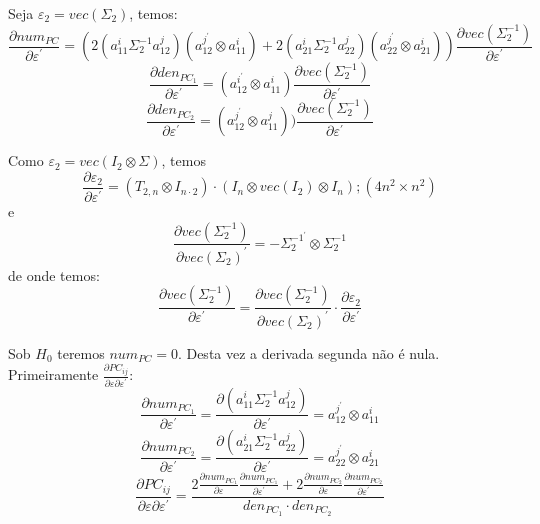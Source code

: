 \documentclass[a4paper,10pt]{article}
\begin{document}
Seja $\varepsilon_{2} = vec(\Sigma_{2})$, temos:
\begin{equation}
\frac{\partial num_{PC}}{\partial \varepsilon^{'}} = (2 (a_{11}^{i} \Sigma_{2}^{-1} a_{12}^{j}) (a_{12}^{j^{'}} \otimes a_{11}^{i}) +
2 (a_{21}^{i} \Sigma_{2}^{-1} a_{22}^{j}) (a_{22}^{j^{'}} \otimes a_{21}^{i}) )
\frac{\partial vec(\Sigma_{2}^{-1})}{\partial \varepsilon^{'}}
\end{equation}
\begin{equation}
\frac{\partial den_{PC_{1}}}{\partial \varepsilon^{'}} = (a_{12}^{i^{'}} \otimes a_{11}^{i}) 
\frac{\partial vec(\Sigma_{2}^{-1})}{\partial \varepsilon^{'}}
\end{equation}
\begin{equation}
\frac{\partial den_{PC_{2}}}{\partial \varepsilon^{'}} = (a_{12}^{j^{'}} \otimes a_{11}^{j}) )
\frac{\partial vec(\Sigma_{2}^{-1})}{\partial \varepsilon^{'}}
\end{equation}

Como $\varepsilon_{2} = vec(I_{2} \otimes \Sigma)$, temos
\begin{equation}
\frac{\partial \varepsilon_{2}}{\partial \varepsilon^{'}} = (T_{2,n} \otimes I_{n \cdot 2}) \cdot (I_{n} \otimes vec(I_{2}) \otimes I_{n}); (4n^{2} \times n^{2})
\end{equation}
e
\begin{equation}
\frac{\partial vec(\Sigma_{2}^{-1})}{\partial vec(\Sigma_{2})^{'}} = -\Sigma_{2}^{-1^{'}} \otimes \Sigma_{2}^{-1}
\end{equation}
de onde temos:
\begin{equation}
\frac{\partial vec(\Sigma_{2}^{-1})}{\partial \varepsilon^{'}} = \frac{\partial vec(\Sigma_{2}^{-1})}{\partial vec(\Sigma_{2})^{'}} \cdot \frac{\partial \varepsilon_{2}}{\partial \varepsilon^{'}}
\end{equation}

Sob $H_0$ teremos $num_{PC} = 0$. Desta vez a derivada segunda não é nula. Primeiramente $\frac{\partial PC_{ij}}{\partial \varepsilon \partial \varepsilon^{'}}$:
\begin{equation}
\frac{\partial num_{PC_{1}}}{\partial \varepsilon^{'}} = \frac{\partial (a_{11}^{i} \Sigma_{2}^{-1} a_{12}^{j})}{\partial \varepsilon^{'}} = a_{12}^{j^{'}} \otimes a_{11}^{i}
\end{equation}
\begin{equation}
\frac{\partial num_{PC_{2}}}{\partial \varepsilon^{'}} = \frac{\partial (a_{21}^{i} \Sigma_{2}^{-1} a_{22}^{j})}{\partial \varepsilon^{'}} = a_{22}^{j^{'}} \otimes a_{21}^{i}
\end{equation}
\begin{equation}
\frac{\partial PC_{ij}}{\partial \varepsilon \partial \varepsilon^{'}} = \frac{2 \frac{\partial num_{PC_{1}}}{\partial \varepsilon} \frac{\partial num_{PC_{1}}}{\partial \varepsilon^{'}} + 2 \frac{\partial num_{PC_{2}}}{\partial \varepsilon} \frac{\partial num_{PC_{2}}}{\partial \varepsilon^{'}}}{den_{PC_{1}} \cdot den_{PC_{2}}}
\end{equation}
\end{document}
